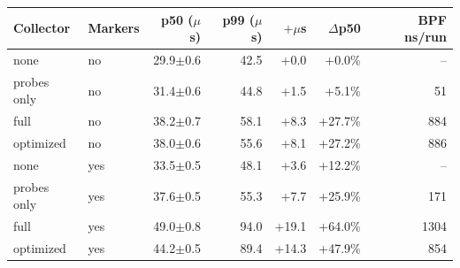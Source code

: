 \begin{tabular*}{\columnwidth}{@{\extracolsep{\fill}}llrrrrr@{}}
\toprule
Collector & Markers & p50 ($\mu$s) & p99 ($\mu$s) & $+\mu$s & $\Delta$p50 & BPF ns/run \\
\midrule
none & no & 29.9$\pm$0.6 & 42.5 & +0.0 & +0.0\% & -- \\
probes only & no & 31.4$\pm$0.6 & 44.8 & +1.5 & +5.1\% & 51 \\
full & no & 38.2$\pm$0.7 & 58.1 & +8.3 & +27.7\% & 884 \\
optimized & no & 38.0$\pm$0.6 & 55.6 & +8.1 & +27.2\% & 886 \\
none & yes & 33.5$\pm$0.5 & 48.1 & +3.6 & +12.2\% & -- \\
probes only & yes & 37.6$\pm$0.5 & 55.3 & +7.7 & +25.9\% & 171 \\
full & yes & 49.0$\pm$0.8 & 94.0 & +19.1 & +64.0\% & 1304 \\
optimized & yes & 44.2$\pm$0.5 & 89.4 & +14.3 & +47.9\% & 854 \\
\bottomrule
\end{tabular*}
